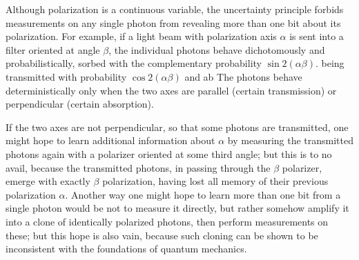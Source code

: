 Although polarization is a continuous variable, the uncertainty principle forbids measurements on any single photon from revealing more than one bit about its polarization. For example, if a light beam with polarization axis $\alpha$ is sent into a filter oriented at angle $\beta$, the individual photons behave dichotomously and probabilistically, sorbed with the complementary probability $\sin 2(\alpha \beta)$. being transmitted with probability $\cos 2(\alpha \beta)$ and ab The photons behave deterministically only when the two axes are parallel (certain transmission) or perpendicular (certain absorption). 

If the two axes are not perpendicular, so that some photons are transmitted, one might hope to learn additional information about $\alpha$ by measuring the transmitted photons again with a polarizer oriented at some third angle; but this is to no avail, because the transmitted photons, in passing through the $\beta$ polarizer, emerge with exactly $\beta$ polarization, having lost all memory of their previous polarization $\alpha$. Another way one might hope to learn more than one bit from a single photon would be not to measure it directly, but rather somehow amplify it into a clone of identically polarized photons, then perform measurements on these; but this hope is also vain, because such cloning can be shown to be inconsistent with the foundations of quantum mechanics\textcite{Wootters1982}.